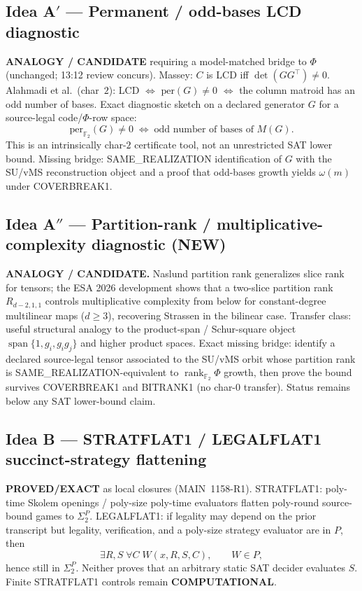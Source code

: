 \documentclass[11pt]{article}
\begin{document}
\subsection*{Idea A$'$ --- Permanent / odd-bases LCD diagnostic}
\textbf{ANALOGY / CANDIDATE} requiring a model-matched bridge to $\Phi$ (unchanged;
13:12 review concurs). Massey: $C$ is LCD iff $\det(GG^\top)\neq 0$.
Alahmadi et al.\ (char~$2$): LCD $\Leftrightarrow$ $\mathrm{per}(G)\neq 0$ $\Leftrightarrow$ the column matroid
has an odd number of bases. Exact diagnostic sketch on a declared generator $G$ for a
source-legal code/$\Phi$-row space:
\[
\mathrm{per}_{\mathbb F_2}(G)\neq 0\;\Leftrightarrow\;\text{odd number of bases of }M(G).
\]
This is an intrinsically char-$2$ certificate tool, not an unrestricted SAT lower bound.
Missing bridge: SAME\_REALIZATION identification of $G$ with the SU/vMS reconstruction
object and a proof that odd-bases growth yields $\omega(m)$ under COVERBREAK1.

\subsection*{Idea A$''$ --- Partition-rank / multiplicative-complexity diagnostic (NEW)}
\textbf{ANALOGY / CANDIDATE.} Naslund partition rank generalizes slice rank for tensors;
the ESA 2026 development shows that a two-slice partition rank $R_{d-2,1,1}$ controls
multiplicative complexity from below for constant-degree multilinear maps ($d\ge 3$),
recovering Strassen in the bilinear case. Transfer class: useful structural analogy to
the product-span / Schur-square object $\operatorname{span}\{1,g_i,g_ig_j\}$ and higher
product spaces. Exact missing bridge: identify a declared source-legal tensor associated
to the SU/vMS orbit whose partition rank is SAME\_REALIZATION-equivalent to
$\operatorname{rank}_{\mathbb F_2}\Phi$ growth, then prove the bound survives COVERBREAK1
and BITRANK1 (no char-$0$ transfer). Status remains below any SAT lower-bound claim.

\subsection*{Idea B --- STRATFLAT1 / LEGALFLAT1 succinct-strategy flattening}
\textbf{PROVED/EXACT} as local closures (MAIN~1158-R1).
STRATFLAT1: poly-time Skolem openings / poly-size poly-time evaluators flatten poly-round
source-bound games to $\Sigma_2^P$.
LEGALFLAT1: if legality may depend on the prior transcript but legality, verification, and a
poly-size strategy evaluator are in $P$, then
\[
\exists R,S\;\forall C\;W(x,R,S,C),\qquad W\in P,
\]
hence still in $\Sigma_2^P$. Neither proves that an arbitrary static SAT decider evaluates $S$.
Finite STRATFLAT1 controls remain \textbf{COMPUTATIONAL}.
\end{document}

